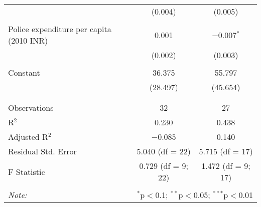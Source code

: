 \begin{table}[!htbp]
\begin{tabular}{@{\extracolsep{5pt}}lcc}
  & (0.004) & (0.005) \\ 
  & & \\ 
 Police expenditure per capita (2010 INR) & 0.001 & $-$0.007$^{*}$ \\ 
  & (0.002) & (0.003) \\ 
  & & \\ 
 Constant & 36.375 & 55.797 \\ 
  & (28.497) & (45.654) \\ 
  & & \\ 
\hline \\[-1.8ex] 
Observations & 32 & 27 \\ 
R$^{2}$ & 0.230 & 0.438 \\ 
Adjusted R$^{2}$ & $-$0.085 & 0.140 \\ 
Residual Std. Error & 5.040 (df = 22) & 5.715 (df = 17) \\ 
F Statistic & 0.729 (df = 9; 22) & 1.472 (df = 9; 17) \\ 
\hline 
\hline \\[-1.8ex] 
\textit{Note:}  & \multicolumn{2}{r}{$^{*}$p$<$0.1; $^{**}$p$<$0.05; $^{***}$p$<$0.01} \\ 
\end{tabular} 
\end{table} 
